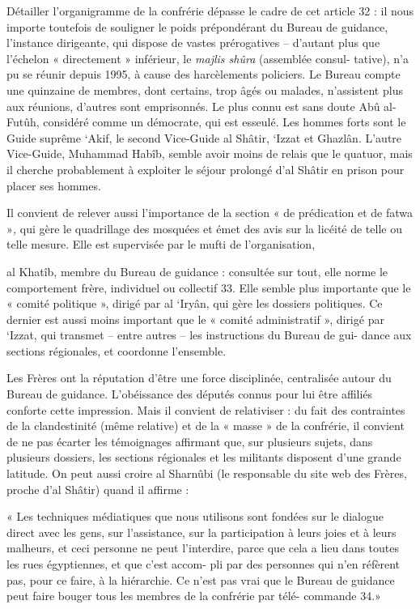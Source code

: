 Détailler l'organigramme de la confrérie dépasse le cadre de cet article
32 : il nous importe toutefois de souligner le poids prépondérant du
Bureau de guidance, l'instance dirigeante, qui dispose de vastes
prérogatives -- d'autant plus que l'échelon « directement » inférieur,
le \emph{majlis shûra} (assemblée consul- tative), n'a pu se réunir
depuis 1995, à cause des harcèlements policiers. Le Bureau compte une
quinzaine de membres, dont certains, trop âgés ou malades, n'assistent
plus aux réunions, d'autres sont emprisonnés. Le plus connu est sans
doute Abû al-Futûh, considéré comme un démocrate, qui est esseulé. Les
hommes forts sont le Guide suprême `Akif, le second Vice-Guide al
Shâtir, `Izzat et Ghazlân. L'autre Vice-Guide, Muhammad Habîb, semble
avoir moins de relais que le quatuor, mais il cherche probablement à
exploiter le séjour prolongé d'al Shâtir en prison pour placer ses
hommes.

Il convient de relever aussi l'importance de la section « de prédication
et de fatwa »\emph{,} qui gère le quadrillage des mosquées et émet des
avis sur la licéité de telle ou telle mesure. Elle est supervisée par le
mufti de l'organisation,

al Khatîb, membre du Bureau de guidance : consultée sur tout, elle norme
le comportement frère, individuel ou collectif 33. Elle semble plus
importante que le « comité politique », dirigé par al `Iryân, qui gère
les dossiers politiques. Ce dernier est aussi moins important que le «
comité administratif », dirigé par `Izzat, qui transmet -- entre autres
-- les instructions du Bureau de gui- dance aux sections régionales, et
coordonne l'ensemble.

Les Frères ont la réputation d'être une force disciplinée, centralisée
autour du Bureau de guidance. L'obéissance des députés connus pour lui
être affiliés conforte cette impression. Mais il convient de relativiser
: du fait des contraintes de la clandestinité (même relative) et de la «
masse » de la confrérie, il convient de ne pas écarter les témoignages
affirmant que, sur plusieurs sujets, dans plusieurs dossiers, les
sections régionales et les militants disposent d'une grande latitude. On
peut aussi croire al Sharnûbi (le responsable du site web des Frères,
proche d'al Shâtir) quand il affirme :

« Les techniques médiatiques que nous utilisons sont fondées sur le
dialogue direct avec les gens, sur l'assistance, sur la participation à
leurs joies et à leurs malheurs, et ceci personne ne peut l'interdire,
parce que cela a lieu dans toutes les rues égyptiennes, et que c'est
accom- pli par des personnes qui n'en réfèrent pas, pour ce faire, à la
hiérarchie. Ce n'est pas vrai que le Bureau de guidance peut faire
bouger tous les membres de la confrérie par télé- commande 34.»
 

